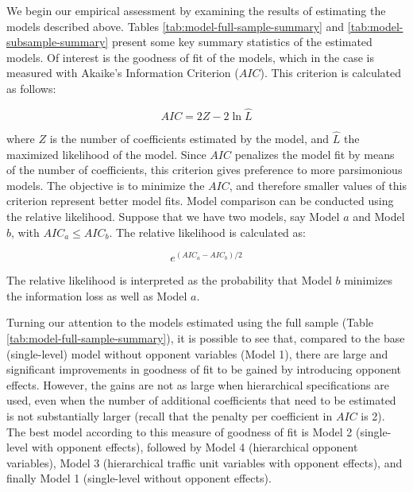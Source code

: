 \documentclass[]{elsarticle} %
\begin{document}
We begin our empirical assessment by examining the results of estimating
the models described above. Tables \ref{tab:model-full-sample-summary}
and \ref{tab:model-subsample-summary} present some key summary
statistics of the estimated models. Of interest is the goodness of fit
of the models, which in the case is measured with Akaike's Information
Criterion (\(AIC\)). This criterion is calculated as follows:

\begin{equation}
\label{eq:aic}
AIC = 2Z - 2\ln{\hat{L}}
\end{equation}

\noindent where \(Z\) is the number of coefficients estimated by the
model, and \(\hat{L}\) the maximized likelihood of the model. Since
\(AIC\) penalizes the model fit by means of the number of coefficients,
this criterion gives preference to more parsimonious models. The
objective is to minimize the \(AIC\), and therefore smaller values of
this criterion represent better model fits. Model comparison can be
conducted using the relative likelihood. Suppose that we have two
models, say Model \(a\) and Model \(b\), with \(AIC_{a} \le AIC_{b}\).
The relative likelihood is calculated as:

\begin{equation}
\label{eq:relative-likelihood}
e^{(AIC_a - AIC_b)/2}
\end{equation}

The relative likelihood is interpreted as the probability that Model
\(b\) minimizes the information loss as well as Model \(a\).

Turning our attention to the models estimated using the full sample
(Table \ref{tab:model-full-sample-summary}), it is possible to see that,
compared to the base (single-level) model without opponent variables
(Model 1), there are large and significant improvements in goodness of
fit to be gained by introducing opponent effects. However, the gains are
not as large when hierarchical specifications are used, even when the
number of additional coefficients that need to be estimated is not
substantially larger (recall that the penalty per coefficient in \(AIC\)
is 2). The best model according to this measure of goodness of fit is
Model 2 (single-level with opponent effects), followed by Model 4
(hierarchical opponent variables), Model 3 (hierarchical traffic unit
variables with opponent effects), and finally Model 1 (single-level
without opponent effects).
\end{document}
